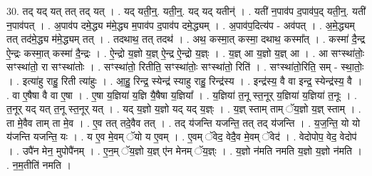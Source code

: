 \documentclass[17pt]{extarticle}
\begin{document}
30. तद् यद् यत् तत् तद् यत् । . यद् यती॒न्॒. यती॒न्॒. यद् यद् यतीन्॑ । . यती॑ न॒पाव॑प द॒पाव॑प॒द् यती॒न्॒. यती॑ न॒पाव॑पत् । . अ॒पाव॑प दमे॒द्ध्य म॑मे॒द्ध्य म॒पाव॑प द॒पाव॑प दमे॒द्ध्यम् । . अ॒पाव॑प॒दित्य॑प - अव॑पत् । . अ॒मे॒द्ध्यम् तत् तद॑मे॒द्ध्य म॑मे॒द्ध्यम् तत् । . तदथाथ॒ तत् तदथ॑ । . अथ॒ कस्मा॒त् कस्मा॒ दथाथ॒ कस्मा᳚त् । . कस्मा॑ दै॒न्द्र ऐ॒न्द्रः कस्मा॒त् कस्मा॑ दै॒न्द्रः । . ऐ॒न्द्रो य॒ज्ञो य॒ज्ञ् ऐ॒न्द्र ऐ॒न्द्रो य॒ज्ञ्ः । . य॒ज्ञ् आ य॒ज्ञो य॒ज्ञ् आ । . आ सꣳस्था॑तोः॒ सꣳस्था॑तो॒ रा सꣳस्था॑तोः । . सꣳस्था॑तो॒ रितीति॒ सꣳस्था॑तोः॒ सꣳस्था॑तो॒ रिति॑ । . सꣳस्था॑तो॒रिति॒ सम् - स्था॒तोः॒ । . इत्या॑हु राहु॒ रिती त्या॑हुः । . आ॒हु॒ रिन्द्र॒ स्येन्द्र॑ स्याहु राहु॒ रिन्द्र॑स्य । . इन्द्र॑स्य॒ वै वा इन्द्र॒ स्येन्द्र॑स्य॒ वै । . वा ए॒षैषा वै वा ए॒षा । . ए॒षा य॒ज्ञिया॑ य॒ज्ञि यै॒षैषा य॒ज्ञिया᳚ । . य॒ज्ञिया॑ त॒नू स्त॒नूर् य॒ज्ञिया॑ य॒ज्ञिया॑ त॒नूः । . त॒नूर् यद् यत् त॒नू स्त॒नूर् यत् । . यद् य॒ज्ञो य॒ज्ञो यद् यद् य॒ज्ञ्ः । . य॒ज्ञ् स्ताम् ताम् ॅय॒ज्ञो य॒ज्ञ् स्ताम् । . ता मे॒वैव ताम् ता मे॒व । . ए॒व तत् तदे॒वैव तत् । . तद् य॑जन्ति यजन्ति॒ तत् तद् य॑जन्ति । . य॒ज॒न्ति॒ यो यो य॑जन्ति यजन्ति॒ यः । . य ए॒व मे॒वम् ॅयो य ए॒वम् । . ए॒वम् ॅवेद॒ वेदै॒व मे॒वम् ॅवेद॑ । . वेदोपोप॒ वेद॒ वेदोप॑ । . उपै॑न मेन॒ मुपोपै॑नम् । . ए॒न॒म् ॅय॒ज्ञो य॒ज्ञ् ए॑न मेनम् ॅय॒ज्ञ्ः । . य॒ज्ञो न॑मति नमति य॒ज्ञो य॒ज्ञो न॑मति । . न॒म॒तीति॑ नमति । \newline
\end{document}
